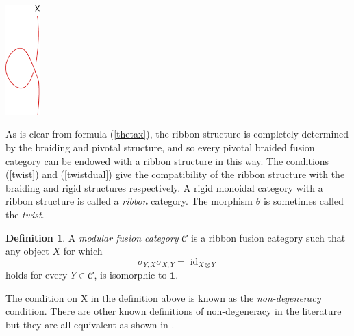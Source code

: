 \documentclass[11pt]{book}
\theoremstyle{Rem}
\theoremstyle{definition}
\newtheorem{defn}[theorem]{Definition}
\numberwithin{equation}{section}
\newcommand\id{\operatorname{id}}
\newcommand\Cat{\mathcal C}
\newcommand\one{\mathbf{1}}
\begin{document}
\begin{center}
\includegraphics[width=0.1\textwidth]{t-matrix.eps}
\end{center}

 As is clear from formula (\ref{thetax}), the ribbon structure is completely determined by the braiding and pivotal structure, and so every pivotal braided fusion category can be endowed with a ribbon structure in this way. The conditions (\ref{twist}) and (\ref{twistdual}) give the compatibility of the ribbon structure with the braiding and rigid structures respectively. A rigid monoidal category with a ribbon structure is called a \textit{ribbon} category.  The morphism $\theta$ is sometimes called the \textit{twist}.\\
\begin{defn}\label{mfcdef}\rm
A \textit{modular fusion category} $\Cat$ is a ribbon fusion category such that any object $X$ for which \begin{equation}\label{muger}
	\sigma_{Y,X}\sigma_{X,Y}= \id_{X\otimes Y}\end{equation}
 holds for every $Y\in \Cat$, is isomorphic to $\one$.
\end{defn}
The condition on X in the definition above is known as the \textit{non-degeneracy} condition. There are other known definitions of non-degeneracy in the literature but they are all equivalent as shown in \cite{Sh}.\\ 
 
\end{document}
